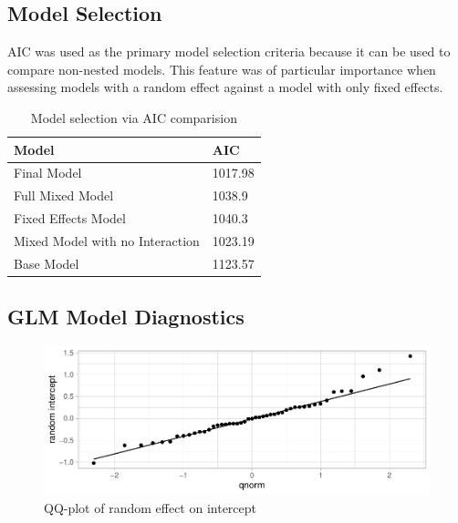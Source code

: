 \documentclass[12pt]{article}
\begin{document}
\hypertarget{model-selection}{%
\subsection{Model Selection}\label{model-selection}}

\label{sec:glmms}

AIC was used as the primary model selection criteria because it can be used to compare non-nested models. This feature was of particular importance when assessing models with a random effect against a model with only fixed effects.

\begin{table}[!h]
\centering
\begin{tabular}{ll}
  \toprule
Model & AIC \\ 
  \midrule
Final Model & 1017.98 \\ 
  Full Mixed Model & 1038.9 \\ 
  Fixed Effects Model & 1040.3 \\ 
  Mixed Model with no Interaction & 1023.19 \\ 
  Base Model & 1123.57 \\ 
   \bottomrule
\end{tabular}
\caption{Model selection via AIC comparision} 
\end{table}

\hypertarget{glm-model-diagnostics}{%
\subsection{GLM Model Diagnostics}\label{glm-model-diagnostics}}

\label{sec:glmmd}

\begin{figure}[H]

{\centering \includegraphics{bookdown_report_files/figure-latex/qq-1} 

}

\caption{QQ-plot of random effect on intercept}\label{fig:qq}
\end{figure}
\end{document}

